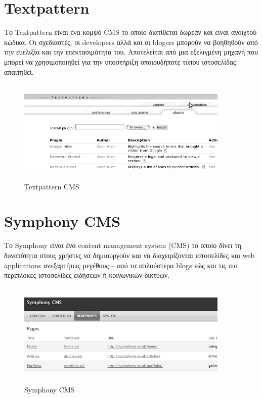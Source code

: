 \documentclass[12pt]{report}
\begin{document}
\section{\textlatin{Textpattern}}
Το \textlatin{Textpattern} είναι ένα κομψό \textlatin{CMS} το οποίο διατίθεται δωρεάν και είναι ανοιχτού κώδικα. Οι σχεδιαστές, οι \textlatin{developers} αλλά και οι \textlatin{blogers} μπορούν να βοηθηθούν από την ευελιξία και την επεκτασιμότητα του. Αποτελείται από μια εξελιγμένη μηχανή που μπορεί να χρησιμοποιηθεί για την υποστήριξη οποιουδήποτε τύπου ιστοσελίδας απαιτηθεί.
\begin{figure}[H]
\centering
\includegraphics[width=0.9\textwidth, height=5cm]{Textpattern-gray}
\caption{\textlatin{Textpattern CMS}}
\label{fig:text_patrn}
\end{figure}

\section{\textlatin{Symphony CMS}}
Το \textlatin{Symphony} είναι ένα \textlatin{content management system (CMS)} το οποίο δίνει τη δυνατότητα στους χρήστες να δημιουργούν και να διαχειρίζονται ιστοσελίδες και \textlatin{web applications} ανεξαρτήτως μεγέθους – από τα απλούστερα \textlatin{blogs} εώς και τις πιο περίπλοκες ιστοσελίδες ειδήσεων ή κοινωνικών δικτύων.
\begin{figure}[H]
\centering
\includegraphics[width=0.9\textwidth, height=5cm]{symphony_cms-gray}
\caption{\textlatin{Symphony CMS}}
\label{fig:symphony_cms}
\end{figure}
\end{document}
